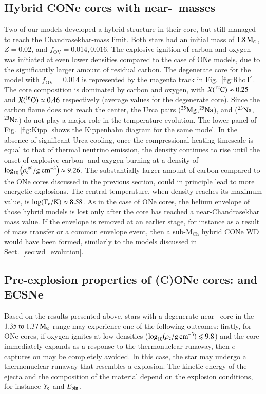 \documentclass[main.tex]{subfiles}
\begin{document}
\newpage
\subsection{Hybrid CONe cores with near-\mch\ masses}\label{sec:cone_core_evolution}
Two of our \seriesone models developed a hybrid 
structure in their core, but still managed to reach 
the Chandrasekhar-mass limit. Both stars had an 
initial mass of $1.8\msun$,  $Z = 0.02$, and 
$f_\text{OV} = 0.014, 0.016$. The explosive 
ignition of carbon and oxygen was initiated at even
lower densities  compared to the case of 
ONe models, due to the significantly larger amount
of residual carbon. The degenerate core for the model with $f_{\text{OV}} = 0.014$
is represented by the magenta track in Fig.~\ref{fig:RhoT}. The core composition is dominated by  carbon and oxygen, 
with $X(\iso{C}{12}) \approx 0.25$ and 
$X(\iso{O}{16}) \approx 0.46$ respectively (average values for the degenerate core). Since the carbon flame does not reach the center, the Urca pairs ($\rm ^{25}Mg$,$\rm ^{25}Na$), and ($\rm ^{23}Na$,$\rm ^{23}Ne$) do not play a major role in the temperature evolution. 
The lower panel of Fig.~\ref{fig:Kipp} shows the Kippenhahn diagram for 
the same model. In the absence of significant Urca cooling, once the 
compressional heating timescale is equal to that  of thermal neutrino 
emission, the density continues to rise until the onset of explosive 
carbon- and oxygen burning at a density of $\rm \log_{10} 
\left(\rho_c^{\rm ign} / \rm g \ cm^{-3} \right) \approx 9.26$. The 
substantially larger amount of carbon compared to the 
ONe cores discussed in the previous section, could in principle lead to more energetic 
explosions. The central temperature, when density reaches its maximum 
value, is $\rm \log(T_c / \rm K) \approx 8.58$.
As in the case of ONe cores, the helium envelope of those hybrid models 
is lost only after the core has reached a near-Chandrasekhar mass value. 
If the envelope is removed at an earlier stage, for instance as a result of mass transfer or a common envelope event, then a sub-M$_{\text{Ch}}$ 
hybrid CONe WD would have been formed, similarly to the models   
discussed in Sect.~\ref{sec:wd_evolution}.

\newpage
\subsection{Pre-explosion properties of (C)ONe cores: \ias and ECSNe}\label{sec:explosion_properties} 
Based on the results presented  above, stars with a degenerate near-\mch\ core in the $\numrange{1.35}{1.37}\msun$ range may experience one of the following outcomes: firstly, for ONe cores, if oxygen ignites at low densities ($\logrhoc \lesssim 9.8$) and the core immediately expands as a response to the thermonuclear runaway, then $e$-captures on  may be completely avoided. In this case, the star may  undergo a thermonuclear runaway that resembles a \ia explosion. The kinetic energy of the ejecta and the composition of the material  depend on the explosion conditions, for instance $Y_{\rm e}$ and $E_{\rm bin}$.
\end{document}
